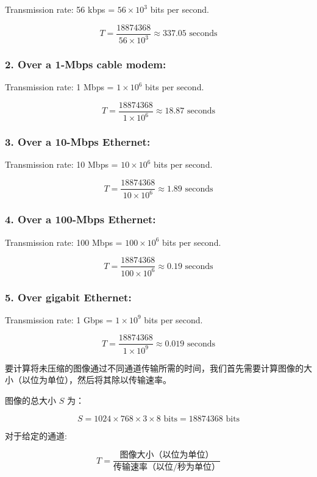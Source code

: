 Transmission rate: 56 kbps = \( 56 \times 10^3 \) bits per second.

\[
T = \frac{18874368}{56 \times 10^3} \approx 337.05 \text{ seconds}
\]

\subsubsection*{2. Over a 1-Mbps cable modem:}

Transmission rate: 1 Mbps = \( 1 \times 10^6 \) bits per second.

\[
T = \frac{18874368}{1 \times 10^6} \approx 18.87 \text{ seconds}
\]

\subsubsection*{3. Over a 10-Mbps Ethernet:}

Transmission rate: 10 Mbps = \( 10 \times 10^6 \) bits per second.

\[
T = \frac{18874368}{10 \times 10^6} \approx 1.89 \text{ seconds}
\]

\subsubsection*{4. Over a 100-Mbps Ethernet:}

Transmission rate: 100 Mbps = \( 100 \times 10^6 \) bits per second.

\[
T = \frac{18874368}{100 \times 10^6} \approx 0.19 \text{ seconds}
\]

\subsubsection*{5. Over gigabit Ethernet:}

Transmission rate: 1 Gbps = \( 1 \times 10^9 \) bits per second.

\[
T = \frac{18874368}{1 \times 10^9} \approx 0.019 \text{ seconds}
\]


要计算将未压缩的图像通过不同通道传输所需的时间，我们首先需要计算图像的大小（以位为单位），然后将其除以传输速率。

图像的总大小 \( S \) 为：

\[
S = 1024 \times 768 \times 3 \times 8 \text{ bits} = 18874368 \text{ bits}
\]

对于给定的通道:

\[
T = \frac{\text{图像大小（以位为单位）}}{\text{传输速率（以位/秒为单位）}}
\]


